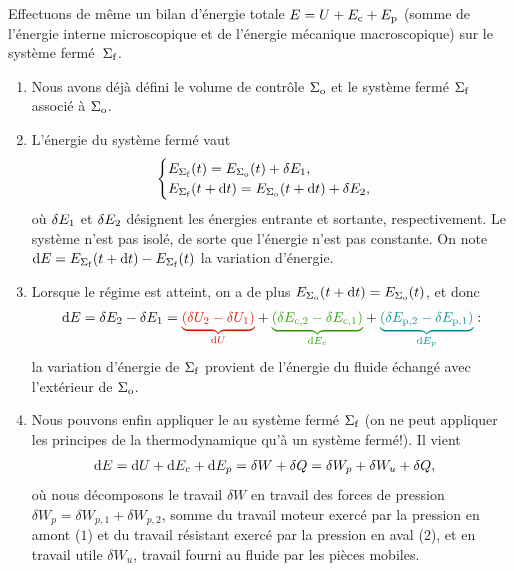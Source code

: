 \documentclass[12pt,fancy]{cours}
\begin{document}
Effectuons de même un bilan d’énergie totale $E=U+E_{\rm{c}}+E_{\rm{p}}$ (somme de l'énergie interne microscopique et de l'énergie mécanique macroscopique) sur le système fermé~$\Sigma_{\rm f}$. 
\begin{enumerate}
  \item Nous avons déjà défini le volume de contrôle $\Sigma_{\rm o}$ et le système fermé $\Sigma_{\rm f}$ associé à $\Sigma_{\rm o}$.
  \item L'énergie du système fermé vaut
  \begin{equation}
    \begin{cases}
      E_{\Sigma_{\rm{f}}}(t)=E_{\Sigma_{\rm{o}}}(t)+\delta E_{\rm{1}},\\
      E_{\Sigma_{\rm{f}}}(t+\mathrm{d} t)=E_{\Sigma_{\rm{o}}}(t+\mathrm{d} t)+\delta E_{\rm{2}},
    \end{cases}
  \end{equation}
où $\delta E_{\rm{1}}$ et $\delta E_{\rm{2}}$ désignent les énergies entrante et sortante, respectivement. Le système n’est pas isolé, de sorte que l’énergie n’est pas constante. On note $\mathrm{d} E = E_{\Sigma_{\rm{f}}}(t+\mathrm{d} t) - E_{\Sigma_{\rm{f}}}(t)$ la variation d’énergie. 
\item 
Lorsque le régime  est atteint, on a de plus $E_{\Sigma_{\rm{o}}}(t+\mathrm{d} t) = E_{\Sigma_{\rm{o}}}(t)$, et donc
\begin{equation}
\d E = \delta E_{\rm 2} - \delta E_{\rm 1} = \JRouge{\underbrace{(\delta U_{\rm 2} - \delta U_{\rm 1})}_{\d U}} + \JVert{\underbrace{(\delta E_{\rm c, 2} - \delta E_{\rm c, 1})}_{\d E_c}} + \JBleu{\underbrace{(\delta E_{\rm p, 2} - \delta E_{\rm p, 1})}_{\d E_p}}:
\end{equation}
 la variation d’énergie de $\Sigma_{\rm f}$ provient de l’énergie du fluide échangé avec l’extérieur de $\Sigma_{\rm o}$.  
 \item Nous pouvons enfin appliquer le  au système fermé $\Sigma_{\rm f}$ (on ne peut appliquer les principes de la thermodynamique qu’à un système fermé!). Il vient
 \begin{align}\label{eq:Ee_ouvert}
 \mathrm{d} E = \mathrm{d} U + \mathrm{d} E_c + \mathrm{d} E_p & = \delta W + \delta Q = \delta W_p + \delta W_u + \delta Q,
 \end{align}
 où nous décomposons le travail $\delta W$ en travail des forces de pression $\delta W_p = \delta W_{p,1} + \delta W_{p,2}$, somme du travail moteur exercé par la pression en amont ($1$) et du travail résistant exercé par la pression en aval ($2$), et en travail utile $\delta W_u$, travail fourni au fluide par les pièces mobiles.

\end{enumerate}
\end{document}
